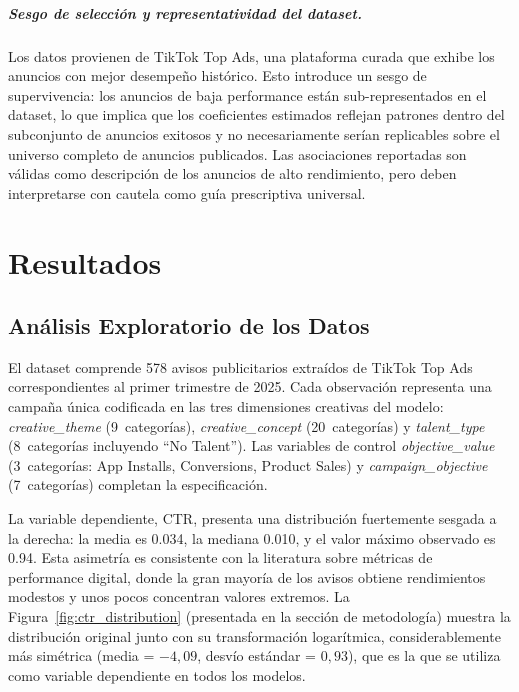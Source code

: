 \documentclass[12pt, a4paper]{report}
\begin{document}
\paragraph{Sesgo de selección y representatividad del dataset.}
Los datos provienen de TikTok Top Ads, una plataforma curada que exhibe los anuncios
con mejor desempeño histórico. Esto introduce un sesgo de supervivencia: los anuncios
de baja performance están sub-representados en el dataset, lo que implica que los
coeficientes estimados reflejan patrones dentro del subconjunto de anuncios exitosos
y no necesariamente serían replicables sobre el universo completo de anuncios publicados.
Las asociaciones reportadas son válidas como descripción de los anuncios de alto
rendimiento, pero deben interpretarse con cautela como guía prescriptiva universal.

\chapter{Resultados}

\section{Análisis Exploratorio de los Datos}

El dataset comprende 578 avisos publicitarios extraídos de TikTok Top Ads
correspondientes al primer trimestre de 2025. Cada observación representa
una campaña única codificada en las tres dimensiones creativas del modelo:
\textit{creative\_theme} (9~categorías), \textit{creative\_concept}
(20~categorías) y \textit{talent\_type} (8~categorías incluyendo ``No
Talent''). Las variables de control \textit{objective\_value}
(3~categorías: App Installs, Conversions, Product Sales) y
\textit{campaign\_objective} (7~categorías) completan la especificación.

La variable dependiente, CTR, presenta una distribución fuertemente
sesgada a la derecha: la media es 0.034, la mediana 0.010, y el valor
máximo observado es 0.94. Esta asimetría es consistente con la literatura
sobre métricas de performance digital, donde la gran mayoría de los avisos
obtiene rendimientos modestos y unos pocos concentran valores extremos.
La Figura~\ref{fig:ctr_distribution} (presentada en la sección de metodología)
muestra la distribución original junto con su transformación logarítmica,
considerablemente más simétrica (media = $-4{,}09$, desvío estándar = $0{,}93$),
que es la que se utiliza como variable dependiente en todos los modelos.
\end{document}
